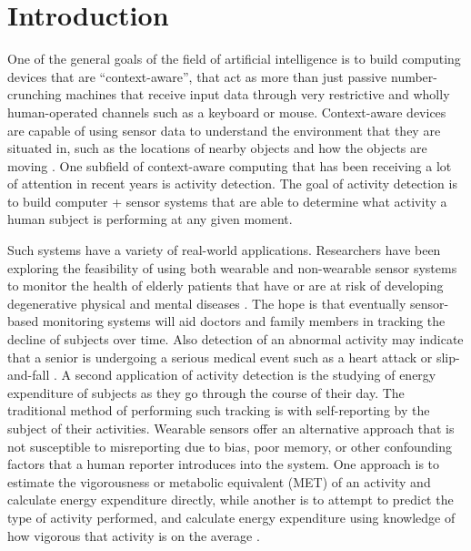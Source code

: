 \chapter{Introduction}
One of the general goals of the field of artificial intelligence is to build
computing devices that are ``context-aware'', that act as
more than just passive number-crunching machines that receive input data through very
restrictive and wholly human-operated channels such as a keyboard or mouse.
Context-aware devices are capable of using sensor data to understand the
environment that they are situated in, such as the locations of nearby objects
and how the objects are moving \cite{abowd99}. One subfield of context-aware
computing that has been receiving a lot of attention in recent years is activity
detection. The goal of activity detection is to build computer + sensor systems
that are able to determine what activity a human subject is performing at any given
moment.

Such systems have a variety of real-world applications. Researchers have been
exploring the feasibility of using both wearable and non-wearable sensor systems to
monitor the health of elderly patients that have or are at risk of developing
degenerative physical and mental diseases \cite{fogarty06}. The hope is that 
eventually sensor-based monitoring systems will aid doctors and family
members in tracking the decline of subjects over time. Also detection of an
abnormal activity may indicate that a senior is undergoing a serious medical
event such as a heart attack or slip-and-fall \cite{wang12}. A second
application of activity detection is the studying of energy expenditure
of subjects as they go through the course of their day. The
traditional method of performing such tracking is with self-reporting by the
subject of their activities. Wearable sensors offer an alternative approach that
is not susceptible to misreporting due to bias, poor memory, or other
confounding factors that a human reporter introduces into the system. One
approach is to estimate the vigorousness or metabolic equivalent
(MET) of an activity and calculate energy expenditure directly, while another
is to attempt to predict the type of activity performed, and calculate energy
expenditure using knowledge of how vigorous that activity is on the average
\cite{staudenmeyer09} \cite{trost12}.

